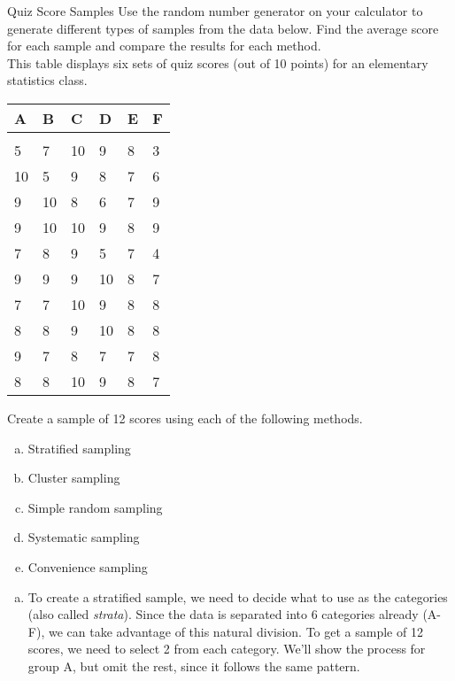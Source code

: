 \begin{example}[https://www.youtube.com/watch?v=Ix-PKoZrJks&list=PLfmpjsIzhzttL_Uec2nCbDRcAcUF7NKG8&index=5]{Quiz Score Samples}
Use the random number generator on your calculator to generate different types of samples from the data below.  Find the average score for each sample and compare the results for each method.\\

This table displays six sets of quiz scores (out of 10 points) for an elementary statistics class.
\begin{center}
\begin{tabular}{l l l l l l}
A & B & C & D & E & F\\
\hline
& & & & & \\
5 & 7 & 10 & 9 & 8 & 3\\
10 & 5 & 9 & 8 & 7 & 6\\
9 & 10 & 8 & 6 & 7 & 9\\
9 & 10 & 10 & 9 & 8 & 9\\
7 & 8 & 9 & 5 & 7 & 4\\
9 & 9 & 9 & 10 & 8 & 7\\
7 & 7 & 10 & 9 & 8 & 8\\
8 & 8 & 9 & 10 & 8 & 8\\
9 & 7 & 8 & 7 & 7 & 8\\
8 & 8 & 10 & 9 & 8 & 7\\
\end{tabular}
\end{center}

Create a sample of 12 scores using each of the following methods.
\begin{enumerate}[(a)]
\item Stratified sampling
\item Cluster sampling
\item Simple random sampling
\item Systematic sampling
\item Convenience sampling
\end{enumerate}

\sol
\begin{enumerate}[(a)]
\item To create a stratified sample, we need to decide what to use as the categories (also called \emph{strata}).  Since the data is separated into 6 categories already (A-F), we can take advantage of this natural division.  To get a sample of 12 scores, we need to select 2 from each category.  We'll show the process for group A, but omit the rest, since it follows the same pattern.\\


\end{enumerate}
\end{example}
